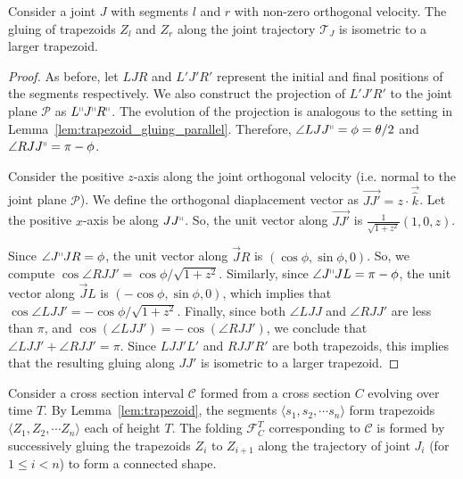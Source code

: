 \begin{lemma}
\label{lem:trapezoid_gluing}
Consider a joint $J$ with segments $l$ and $r$ with non-zero orthogonal velocity.
The gluing of trapezoids $Z_l$ and $Z_r$ along the joint trajectory $\mathcal T_J$ is isometric to a larger trapezoid.
\end{lemma}
\begin{adjustbox}{valign=C,raise=\strutheight,minipage={1.0\linewidth}}

\strut{}
\vspace*{-2em}
\begin{proof}
As before, let $LJR$ and $L'J'R'$ represent the initial and final positions of the segments respectively.
We also construct the projection of $L'J'R'$ to the joint plane $\mathcal P$ as $L^\shortparallel J^\shortparallel R^\shortparallel$.
The evolution of the projection is analogous to the setting in Lemma~\ref{lem:trapezoid_gluing_parallel}.
Therefore, $\angle LJJ^\shortparallel = \phi = \theta/2$ and $\angle RJJ^\shortparallel = \pi-\phi$.

Consider the positive $z$-axis along the joint orthogonal velocity (i.e. normal to the joint plane $\mathcal P$).
We define the orthogonal diaplacement vector as $\overrightarrow{JJ'} = z\cdot\vec{\hat k}$.
Let the positive $x$-axis be along $JJ^\shortparallel$. So, the unit vector along $\overrightarrow{JJ'}$ is $\frac{1}{\sqrt{1+z^2}}(1,0,z)$.

Since $\angle J^\shortparallel JR = \phi$, the unit vector along $\overrightarrow JR$ is $(\cos\phi,\sin\phi,0)$.
So, we compute $\cos \angle RJJ' = \cos\phi/\sqrt{1+z^2}$.
Similarly, since $\angle J^\shortparallel JL = \pi-\phi$, the unit vector along $\overrightarrow JL$ is $(-\cos\phi,\sin\phi,0)$,
which implies that $\cos \angle LJJ' = -\cos\phi/\sqrt{1+z^2}$.
Finally, since both $\angle LJJ$ and $\angle RJJ'$ are less than $\pi$, and $\cos\left(\angle LJJ' \right) = -\cos\left(\angle RJJ' \right)$,
we conclude that $\angle LJJ' + \angle RJJ' = \pi$.
Since $LJJ'L'$ and $RJJ'R'$ are both trapezoids, this implies that the resulting gluing along $JJ'$ is isometric to a larger trapezoid.
\end{proof}
\end{adjustbox}

\begin{definition}
\label{def:interval_folding}
Consider a cross section interval $\mathcal C$ formed from a cross section $C$ evolving over time $T$.
By Lemma~\ref{lem:trapezoid}, the segments $ \langle s_1, s_2,\cdots s_n \rangle$ form trapezoids
$ \langle Z_1, Z_2,\cdots Z_n \rangle$ each of height $T$.
The folding $\mathcal F_C^T$ corresponding to $\mathcal C$ is formed by successively gluing the trapezoids
$Z_i$ to $Z_{i+1}$ along the trajectory of joint $J_i$ (for $1\le i<n$) to form a connected shape.
\end{definition}


